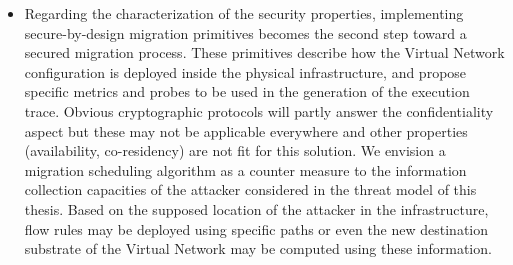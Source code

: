 \begin{itemize}

    \item 
    Regarding the characterization of the security properties, implementing secure-by-design migration primitives becomes the second step toward a secured migration process. These primitives describe how the Virtual Network configuration is deployed inside the physical infrastructure, and propose specific metrics and probes to be used in the generation of the execution trace. Obvious cryptographic protocols will partly answer the confidentiality aspect but these may not be applicable everywhere and other properties (\eg availability, co-residency) are not fit for this solution. We envision a migration scheduling algorithm as a counter measure to the information collection capacities of the attacker considered in the threat model of this thesis. Based on the supposed location of the attacker in the infrastructure, flow rules may be deployed using specific paths or even the new destination substrate of the Virtual Network may be computed using these information. 
    
\end{itemize}

